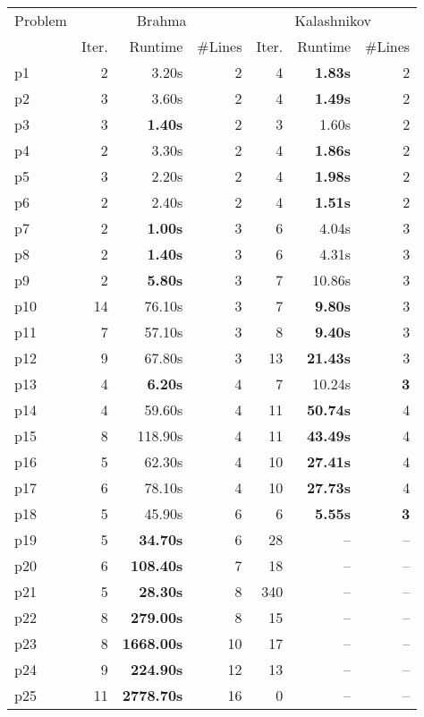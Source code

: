 \begin{tabular}{l||rrr|rrr}
Problem & \multicolumn{3}{c}{\sc Brahma} & \multicolumn{3}{|c}{\sc Kalashnikov} \\
        & Iter. & Runtime & \#Lines & Iter. & Runtime & \#Lines \\
\hline
\hline
p1 & 2 & 3.20s &2 &4 & {\bf 1.83s} &2 \\
p2 & 3 & 3.60s &2 &4 & {\bf 1.49s} &2 \\
p3 & 3 & {\bf 1.40s} &2 &3 & 1.60s &2 \\
p4 & 2 & 3.30s &2 &4 & {\bf 1.86s} &2 \\
p5 & 3 & 2.20s &2 &4 & {\bf 1.98s} &2 \\
p6 & 2 & 2.40s &2 &4 & {\bf 1.51s} &2 \\
p7 & 2 & {\bf 1.00s} &3 &6 & 4.04s &3 \\
p8 & 2 & {\bf 1.40s} &3 &6 & 4.31s &3 \\
p9 & 2 & {\bf 5.80s} &3 &7 & 10.86s &3 \\
p10 & 14 & 76.10s &3 &7 & {\bf 9.80s} &3 \\
p11 & 7 & 57.10s &3 &8 & {\bf 9.40s} &3 \\
p12 & 9 & 67.80s &3 &13 & {\bf 21.43s} &3 \\
p13 & 4 & {\bf 6.20s} &4 &7 & 10.24s &{\bf 3} \\
p14 & 4 & 59.60s &4 &11 & {\bf 50.74s} &4 \\
p15 & 8 & 118.90s &4 &11 & {\bf 43.49s} &4 \\
p16 & 5 & 62.30s &4 &10 & {\bf 27.41s} &4 \\
p17 & 6 & 78.10s &4 &10 & {\bf 27.73s} &4 \\
p18 & 5 & 45.90s &6 &6 & {\bf 5.55s} &{\bf 3} \\
p19 & 5 & {\bf 34.70s} &6 &28 & -- &-- \\
p20 & 6 & {\bf 108.40s} &7 &18 & -- &-- \\
p21 & 5 & {\bf 28.30s} &8 &340 & -- &-- \\
p22 & 8 & {\bf 279.00s} &8 &15 & -- &-- \\
p23 & 8 & {\bf 1668.00s} &10 &17 & -- &-- \\
p24 & 9 & {\bf 224.90s} &12 &13 & -- &-- \\
p25 & 11 & {\bf 2778.70s} &16 &0 & -- &-- \\
\end{tabular}
